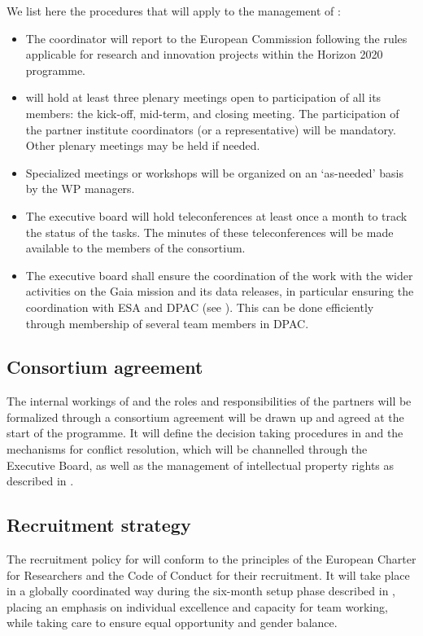 We list here the procedures that will apply to the management of {\acro}:
\begin{itemize}
    \item The {\acro} coordinator will report to the European Commission following the rules applicable for research and innovation projects within the Horizon 2020 programme.
    \item {\acro} will hold at least three plenary meetings open to participation of all its members: the kick-off, mid-term, and closing meeting. The participation of the partner institute coordinators (or a representative) will be mandatory. Other plenary meetings may be held if needed.
    \item Specialized meetings or workshops will be organized on an `as-needed' basis by the WP managers.
    \item The executive board will hold teleconferences at least once a month to track the status of the tasks. The minutes of these teleconferences will be made available to the members of the consortium.
    \item The executive board shall ensure the coordination of the {\acro} work with the wider activities on the Gaia mission and its data releases, in particular ensuring the coordination with ESA and DPAC (see ). This can be done efficiently through membership of several {\acro} team members in DPAC.
\end{itemize}

\subsection{Consortium agreement}
\label{sec:cons_agreement}

The internal workings of {\acro} and the roles and responsibilities of the partners will be formalized through a consortium agreement will be drawn up and agreed at the start of the programme. It will define the decision taking procedures in {\acro} and the mechanisms for conflict resolution, which will be channelled through the Executive Board, as well as the management of intellectual property rights as described in .

\subsection{Recruitment strategy}
\label{sec:recruit}

The recruitment policy for {\acro} will conform to the principles of the European Charter for Researchers and the Code of Conduct for their recruitment. It will take place in a globally coordinated way during the six-month setup phase described in , placing an emphasis on individual excellence and capacity for team working, while taking care to ensure equal opportunity and gender balance.

